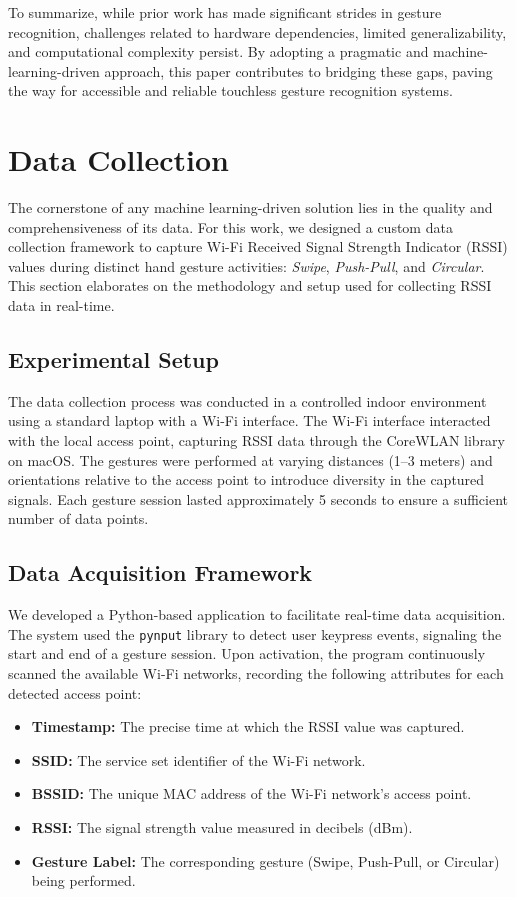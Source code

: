 \documentclass[10pt,twocolumn,letterpaper]{article}
\begin{document}
To summarize, while prior work has made significant strides in gesture recognition, challenges related to hardware dependencies, limited generalizability, and computational complexity persist. By adopting a pragmatic and machine-learning-driven approach, this paper contributes to bridging these gaps, paving the way for accessible and reliable touchless gesture recognition systems.



\section{Data Collection}

The cornerstone of any machine learning-driven solution lies in the quality and comprehensiveness of its data. For this work, we designed a custom data collection framework to capture Wi-Fi Received Signal Strength Indicator (RSSI) values during distinct hand gesture activities: \textit{Swipe}, \textit{Push-Pull}, and \textit{Circular}. This section elaborates on the methodology and setup used for collecting RSSI data in real-time.

\subsection{Experimental Setup}

The data collection process was conducted in a controlled indoor environment using a standard laptop with a Wi-Fi interface. The Wi-Fi interface interacted with the local access point, capturing RSSI data through the CoreWLAN library on macOS. The gestures were performed at varying distances (1–3 meters) and orientations relative to the access point to introduce diversity in the captured signals. Each gesture session lasted approximately 5 seconds to ensure a sufficient number of data points.

\subsection{Data Acquisition Framework}

We developed a Python-based application to facilitate real-time data acquisition. The system used the \texttt{pynput} library to detect user keypress events, signaling the start and end of a gesture session. Upon activation, the program continuously scanned the available Wi-Fi networks, recording the following attributes for each detected access point:

\begin{itemize}
    \item \textbf{Timestamp:} The precise time at which the RSSI value was captured.
    \item \textbf{SSID:} The service set identifier of the Wi-Fi network.
    \item \textbf{BSSID:} The unique MAC address of the Wi-Fi network's access point.
    \item \textbf{RSSI:} The signal strength value measured in decibels (dBm).
    \item \textbf{Gesture Label:} The corresponding gesture (Swipe, Push-Pull, or Circular) being performed.
\end{itemize}
\end{document}
